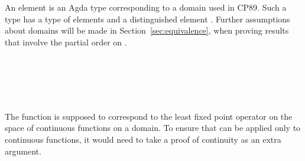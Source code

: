 \begin{AgdaAlign}
An element  is an Agda type corresponding to a domain used in CP89.
Such a type  has a type of elements 
and a distinguished element .
Further assumptions about domains
will be made in Section~\ref{sec:equivalence}, when proving results that
involve the partial order on .
%
\begin{code}%
\>[0]\AgdaSpace{}%
\<%
\\
\>[0][@{}l@{\AgdaIndent{0}}]%
\>[4]\AgdaSymbol{(}\AgdaSpace{}%
%
\>[14]\AgdaSymbol{:}%
\>[17]\AgdaSpace{}%
\AgdaSymbol{)}\<%
\\
%
\>[4]\AgdaSymbol{(}\AgdaSpace{}%
%
\>[14]\AgdaSymbol{:}%
\>[17]\AgdaSpace{}%
\AgdaSpace{}%
\AgdaSpace{}%
\AgdaSymbol{)}\<%
\\
%
\>[4]\AgdaSymbol{(}\AgdaSpace{}%
%
\>[14]\AgdaSymbol{:}%
\>[17]\AgdaSymbol{\{}\AgdaSpace{}%
\AgdaSymbol{:}\AgdaSpace{}%
\AgdaSymbol{\}}\AgdaSpace{}%
\AgdaSpace{}%
\AgdaSpace{}%
\AgdaSpace{}%
\AgdaSpace{}%
\AgdaSymbol{)}\<%
\\
%
\>[4]\AgdaSymbol{(}\AgdaSpace{}%
%
\>[14]\AgdaSymbol{:}%
\>[17]\AgdaSymbol{\{}\AgdaSpace{}%
\AgdaSymbol{:}\AgdaSpace{}%
\AgdaSymbol{\}}\AgdaSpace{}%
\AgdaSpace{}%
\AgdaSymbol{(}\AgdaSpace{}%
\AgdaSpace{}%
\AgdaSpace{}%
\AgdaSpace{}%
\AgdaSpace{}%
\AgdaSpace{}%
\AgdaSpace{}%
\AgdaSpace{}%
\AgdaSymbol{)}\AgdaSpace{}%
\AgdaSpace{}%
\AgdaSpace{}%
\AgdaSpace{}%
\AgdaSpace{}%
\AgdaSymbol{)}\<%
\end{code}
%
The function  is supposed to correspond to the least fixed point operator
on the space of continuous functions on a domain.
To ensure that  can be applied only to continuous functions,
it would need to take a proof of continuity as an extra argument.


\end{AgdaAlign}
